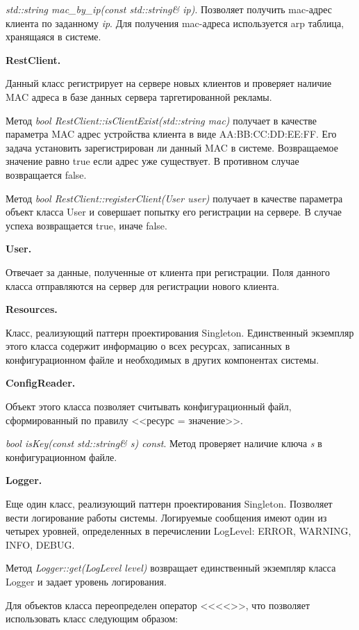\textit{std::string mac\_by\_ip(const std::string\& ip)}. Позволяет получить mac-адрес клиента по заданному \textit{ip}. Для получения mac-адреса используется arp таблица, хранящаяся в системе.

\textbf{RestClient.}

Данный класс регистрирует на сервере новых клиентов и проверяет наличие MAC адреса в базе данных сервера таргетированной рекламы.

Метод \textit{bool RestClient::isClientExist(std::string mac)} получает в качестве параметра MAC адрес устройства клиента в виде AA:BB:CC:DD:EE:FF. Его задача установить зарегистрирован ли данный MAC в системе. Возвращаемое значение равно true если адрес уже существует. В противном случае возвращается false.

Метод \textit{bool RestClient::registerClient(User user)} получает в качестве параметра объект класса User и совершает попытку его регистрации на сервере. В случае успеха возвращается true, иначе false.

\textbf{User.}

Отвечает за данные, полученные от клиента при регистрации. Поля данного класса отправляются на сервер для регистрации нового клиента.

\textbf{Resources.}

Класс, реализующий паттерн проектирования Singleton. Единственный экземпляр этого класса содержит информацию о всех ресурсах, записанных в конфигурационном файле и необходимых в других компонентах системы.

\textbf{ConfigReader.}

Объект этого класса позволяет считывать конфигурационный файл, сформированный по правилу <<ресурс = значение>>.

\textit{bool isKey(const std::string\& s) const}. Метод проверяет наличие ключа \textit{s} в конфигурационном файле.

\textbf{Logger.}

Еще один класс, реализующий паттерн проектирования Singleton. Позволяет вести логирование работы системы. Логируемые сообщения имеют один из четырех уровней, определенных в перечислении LogLevel: ERROR, WARNING, INFO, DEBUG.

Метод \textit{Logger::get(LogLevel level)} возвращает единственный экземпляр класса Logger и задает уровень логирования.

Для объектов класса переопределен оператор <<<<>>, что позволяет использовать класс следующим образом:

